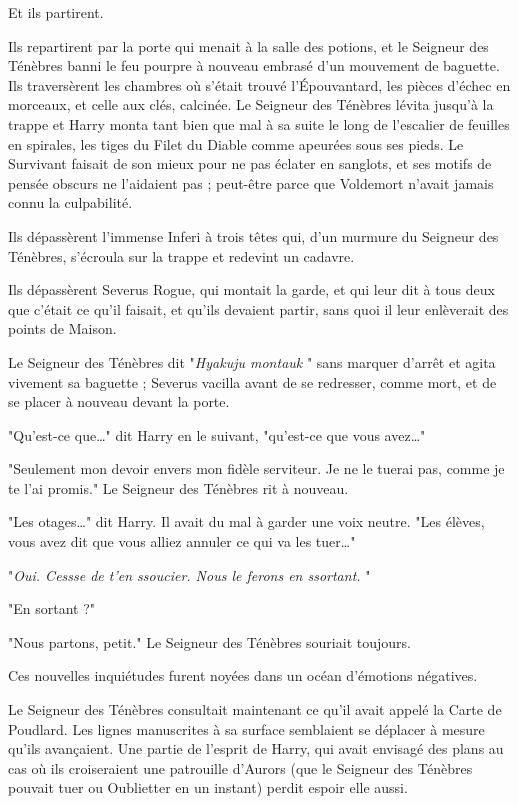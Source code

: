 Et ils partirent.

Ils repartirent par la porte qui menait à la salle des potions, et le Seigneur des Ténèbres banni le feu pourpre à nouveau embrasé d'un mouvement de baguette. Ils traversèrent les chambres où s'était trouvé l'Épouvantard, les pièces d'échec en morceaux, et celle aux clés, calcinée. Le Seigneur des Ténèbres lévita jusqu'à la trappe et Harry monta tant bien que mal à sa suite le long de l'escalier de feuilles en spirales, les tiges du Filet du Diable comme apeurées sous ses pieds. Le Survivant faisait de son mieux pour ne pas éclater en sanglots, et ses motifs de pensée obscurs ne l'aidaient pas ; peut-être parce que Voldemort n'avait jamais connu la culpabilité.

Ils dépassèrent l'immense Inferi à trois têtes qui, d'un murmure du Seigneur des Ténèbres, s'écroula sur la trappe et redevint un cadavre.

Ils dépassèrent Severus Rogue, qui montait la garde, et qui leur dit à tous deux que c'était ce qu'il faisait, et qu'ils devaient partir, sans quoi il leur enlèverait des points de Maison.

Le Seigneur des Ténèbres dit "\emph{Hyakuju montauk} " sans marquer d'arrêt et agita vivement sa baguette ; Severus vacilla avant de se redresser, comme mort, et de se placer à nouveau devant la porte.

"Qu'est-ce que…" dit Harry en le suivant, "qu'est-ce que vous avez…"

"Seulement mon devoir envers mon fidèle serviteur. Je ne le tuerai pas, comme je te l'ai promis." Le Seigneur des Ténèbres rit à nouveau.

"Les otages…" dit Harry. Il avait du mal à garder une voix neutre. "Les élèves, vous avez dit que vous alliez annuler ce qui va les tuer…"

"\emph{Oui. Cessse de t'en ssoucier. Nous le ferons en ssortant.} "

"En sortant ?"

"Nous partons, petit." Le Seigneur des Ténèbres souriait toujours.

Ces nouvelles inquiétudes furent noyées dans un océan d'émotions négatives.

Le Seigneur des Ténèbres consultait maintenant ce qu'il avait appelé la Carte de Poudlard. Les lignes manuscrites à sa surface semblaient se déplacer à mesure qu'ils avançaient. Une partie de l'esprit de Harry, qui avait envisagé des plans au cas où ils croiseraient une patrouille d'Aurors (que le Seigneur des Ténèbres pouvait tuer ou Oublietter en un instant) perdit espoir elle aussi.

